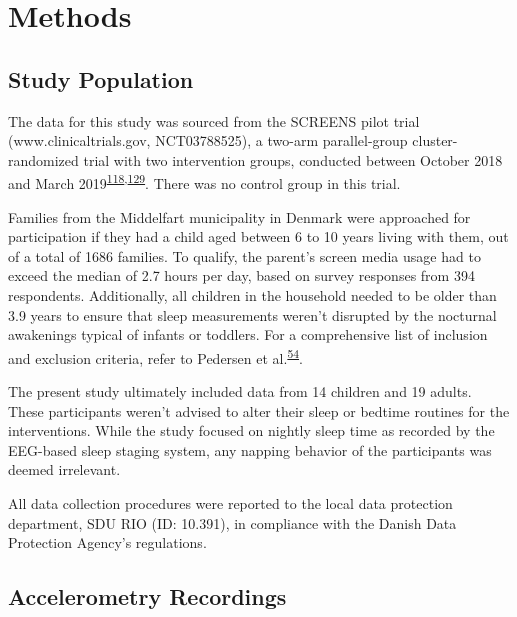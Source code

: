 \documentclass[
  10pt,
]{scrbook}
\begin{document}
\hypertarget{methods}{%
\section{Methods}\label{methods}}

\hypertarget{study-population}{%
\subsection{Study Population}\label{study-population}}

The data for this study was sourced from the SCREENS pilot trial
(www.clinicaltrials.gov, NCT03788525), a two-arm parallel-group
cluster-randomized trial with two intervention groups, conducted between
October 2018 and March
2019\textsuperscript{\protect\hyperlink{ref-rasmussen_short-term_2020}{118},\protect\hyperlink{ref-rasmussen_feasibility_2021}{129}}.
There was no control group in this trial.

Families from the Middelfart municipality in Denmark were approached for
participation if they had a child aged between 6 to 10 years living with
them, out of a total of 1686 families. To qualify, the parent's screen
media usage had to exceed the median of 2.7 hours per day, based on
survey responses from 394 respondents. Additionally, all children in the
household needed to be older than 3.9 years to ensure that sleep
measurements weren't disrupted by the nocturnal awakenings typical of
infants or toddlers. For a comprehensive list of inclusion and exclusion
criteria, refer to Pedersen et
al.\textsuperscript{\protect\hyperlink{ref-pedersen_self-administered_2021}{54}}.

The present study ultimately included data from 14 children and 19
adults. These participants weren't advised to alter their sleep or
bedtime routines for the interventions. While the study focused on
nightly sleep time as recorded by the EEG-based sleep staging system,
any napping behavior of the participants was deemed irrelevant.

All data collection procedures were reported to the local data
protection department, SDU RIO (ID: 10.391), in compliance with the
Danish Data Protection Agency's regulations.

\hypertarget{accelerometry-recordings}{%
\subsection{Accelerometry Recordings}\label{accelerometry-recordings}}
\end{document}

